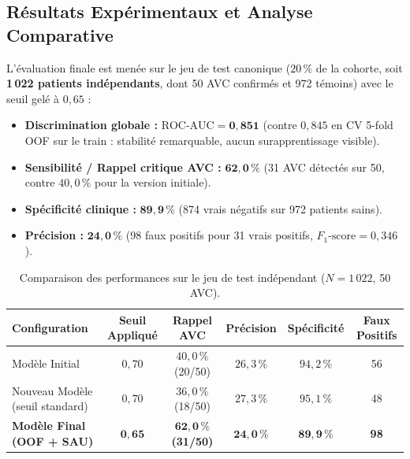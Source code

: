 \subsection{Résultats Expérimentaux et Analyse Comparative}

L'évaluation finale est menée sur le jeu de test canonique ($20\,\%$ de la cohorte, soit \textbf{1\,022 patients indépendants}, dont 50 AVC confirmés et 972 témoins) avec le seuil gelé à $0{,}65$ :
\begin{itemize}
    \item \textbf{Discrimination globale :} $\text{ROC-AUC} = \mathbf{0{,}851}$ (contre $0{,}845$ en CV 5-fold OOF sur le train : stabilité remarquable, aucun surapprentissage visible).
    \item \textbf{Sensibilité / Rappel critique AVC :} $\mathbf{62{,}0\,\%}$ (31 AVC détectés sur 50, contre $40{,}0\,\%$ pour la version initiale).
    \item \textbf{Spécificité clinique :} $\mathbf{89{,}9\,\%}$ (874 vrais négatifs sur 972 patients sains).
    \item \textbf{Précision :} $\mathbf{24{,}0\,\%}$ (98 faux positifs pour 31 vrais positifs, $F_1\text{-score} = 0{,}346$).
\end{itemize}

\begin{table}[htbp]
\centering
\small
\caption{Comparaison des performances sur le jeu de test indépendant ($N = 1\,022$, 50 AVC).}
\label{tab:perf_agent2}
\vspace{0.2cm}
\begin{tabular}{lccccc}
\toprule
\textbf{Configuration} & \textbf{Seuil Appliqué} & \textbf{Rappel AVC} & \textbf{Précision} & \textbf{Spécificité} & \textbf{Faux Positifs} \\
\midrule
Modèle Initial & $0{,}70$ & $40{,}0\,\%$ (20/50) & $26{,}3\,\%$ & $94{,}2\,\%$ & 56 \\
Nouveau Modèle (seuil standard) & $0{,}70$ & $36{,}0\,\%$ (18/50) & $27{,}3\,\%$ & $95{,}1\,\%$ & 48 \\
\textbf{Modèle Final (OOF + SAU)} & $\mathbf{0{,}65}$ & $\mathbf{62{,}0\,\%}$ \textbf{(31/50)} & $\mathbf{24{,}0\,\%}$ & $\mathbf{89{,}9\,\%}$ & \textbf{98} \\
\bottomrule
\end{tabular}
\end{table}

